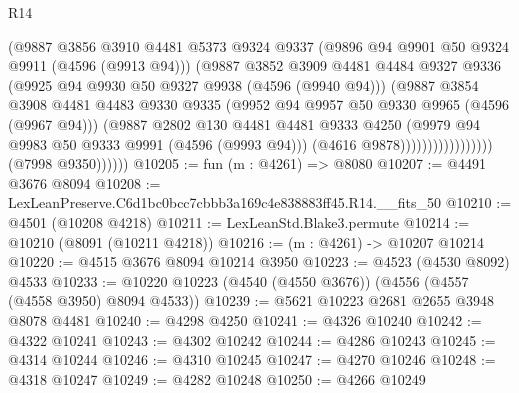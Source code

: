 \begin{lexlean}{R14}
\begin{coremodule}
                                      (@9887
                                        @3856
                                        @3910
                                        @4481
                                        @5373
                                        @9324
                                        @9337
                                        (@9896 @94 @9901 @50 @9324 @9911 (@4596 (@9913 @94)))
                                        (@9887
                                          @3852
                                          @3909
                                          @4481
                                          @4484
                                          @9327
                                          @9336
                                          (@9925 @94 @9930 @50 @9327 @9938 (@4596 (@9940 @94)))
                                          (@9887
                                            @3854
                                            @3908
                                            @4481
                                            @4483
                                            @9330
                                            @9335
                                            (@9952 @94 @9957 @50 @9330 @9965 (@4596 (@9967 @94)))
                                            (@9887
                                              @2802
                                              @130
                                              @4481
                                              @4481
                                              @9333
                                              @4250
                                              (@9979 @94 @9983 @50 @9333 @9991 (@4596 (@9993 @94)))
                                              (@4616 @9878)))))))))))))))))
              (@7998 @9350))))))
@10205 := fun (m : @4261) => @8080
@10207 := @4491 @3676 @8094
@10208 := LexLeanPreserve.C6d1bc0bcc7cbbb3a169c4e838883ff45.R14.__fits_50
@10210 := @4501 (@10208 @4218)
@10211 := LexLeanStd.Blake3.permute
@10214 := @10210 (@8091 (@10211 @4218))
@10216 := (m : @4261) -> @10207 @10214
@10220 := @4515 @3676 @8094 @10214 @3950
@10223 := @4523 (@4530 @8092) @4533
@10233 := @10220 @10223 (@4540 (@4550 @3676)) (@4556 (@4557 (@4558 @3950) @8094 @4533))
@10239 := @5621 @10223 @2681 @2655 @3948 @8078 @4481
@10240 := @4298 @4250
@10241 := @4326 @10240
@10242 := @4322 @10241
@10243 := @4302 @10242
@10244 := @4286 @10243
@10245 := @4314 @10244
@10246 := @4310 @10245
@10247 := @4270 @10246
@10248 := @4318 @10247
@10249 := @4282 @10248
@10250 := @4266 @10249

\end{coremodule}
\end{lexlean}
